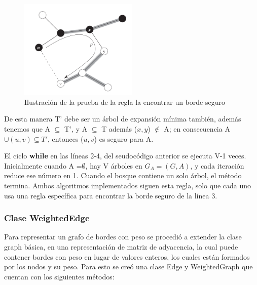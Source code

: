 \documentclass[a4paper, 11pt]{report}
\begin{document}
\begin{figure}[!h]
\centering
\includegraphics[width=0.5\textwidth]{./safeedge.png} 
\caption{Ilustración de la prueba de la regla la encontrar un borde seguro}
\label{F:MST3}
\end{figure}

De esta manera T' debe ser un árbol de expansión mínima también, además tenemos que A $\subseteq$ T', y A $\subseteq$ T además ($x, y$) $\notin$ A; en consecuencia A$\cup {(u, v)} \subseteq T'$, entonces ($u, v$) es seguro para A.

El ciclo \textbf{while} en las líneas 2-4, del seudocódigo anterior se ejecuta V-1 veces. Inicialmente cuando A =$ \emptyset$, hay V árboles en $G_A = (G,A)$, y cada iteración reduce ese número en 1. Cuando el bosque contiene un solo árbol, el método termina. Ambos algoritmos implementados siguen esta regla, solo que cada uno usa una regla específica para encontrar la borde seguro de la línea 3.

\subsubsection{Clase WeightedEdge}

Para representar un grafo de bordes con peso se procedió a extender la clase graph básica, en una representación de matriz de adyacencia, la cual puede contener bordes con peso en lugar de valores enteros, los cuales están formados por los nodos y su peso. Para esto se creó una clase Edge y WeightedGraph que cuentan con los siguientes métodos:
\end{document}
